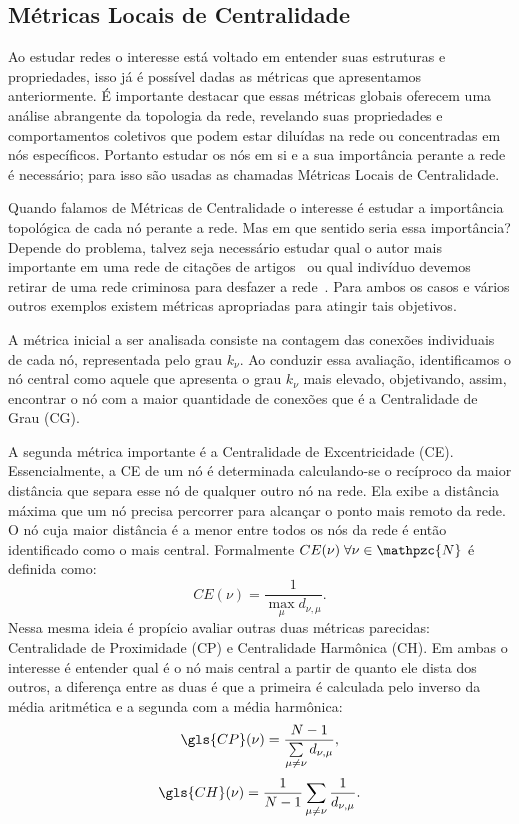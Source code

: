 \subsection{Métricas Locais de Centralidade}


Ao estudar redes o interesse está voltado em entender suas estruturas e propriedades, isso já é possível dadas as métricas que apresentamos anteriormente. É importante destacar que essas métricas globais oferecem uma análise abrangente da topologia da rede, revelando suas propriedades e comportamentos coletivos que podem estar diluídas na rede ou concentradas em nós específicos. Portanto estudar os nós em si e a sua importância perante a rede é necessário; para isso são usadas as chamadas Métricas Locais de Centralidade. 

Quando falamos de Métricas de Centralidade o interesse é estudar a importância topológica de cada nó perante a rede. 
Mas em que sentido seria essa importância? Depende do problema, talvez seja necessário estudar qual o autor mais importante em uma rede de citações de artigos~\cite{Leydesdorff2011} ou qual indivíduo devemos retirar de uma rede criminosa para desfazer a rede~\cite{deAndrade2021}. Para ambos os casos e vários outros exemplos existem métricas apropriadas para atingir tais objetivos.

A métrica inicial a ser analisada consiste na contagem das conexões individuais de cada nó, representada pelo grau $k_\nu$. Ao conduzir essa avaliação, identificamos o nó central como aquele que apresenta o grau $k_\nu$ mais elevado, objetivando, assim, encontrar o nó com a maior quantidade de conexões que é a Centralidade de Grau (\gls{CG}).

A segunda métrica importante é a Centralidade de Excentricidade (\gls{CE}). Essencialmente, a CE de um nó é determinada calculando-se o recíproco da maior distância que separa esse nó de qualquer outro nó na rede. Ela exibe a distância máxima que um nó precisa percorrer para alcançar o ponto mais remoto da rede. O nó cuja maior distância é a menor entre todos os nós da rede é então identificado como o mais central. Formalmente $CE(\nu)\; \forall \nu \in \mathpzc{N}$ é definida como:
\begin{equation}
  CE(\nu) = \frac{1}{\max\limits_{\mu} d_{\nu,\mu}}.
\end{equation}
Nessa mesma ideia é propício avaliar outras duas métricas parecidas: Centralidade de Proximidade (\gls{CP}) e Centralidade Harmônica (\gls{CH}). Em ambas o interesse é entender qual é o nó mais central a partir de quanto ele dista dos outros, a diferença entre as duas é que a primeira é calculada pelo inverso da média aritmética e a segunda com a média harmônica:
\begin{equation}
  \gls{CP}(\nu) = \frac{N - 1}{\sum\limits_{\mu \neq \nu} d_{\nu,\mu}},
\end{equation}
\begin{equation}
  \gls{CH}(\nu) = \frac{1}{N - 1}\sum_{\mu \neq \nu}\frac{1}{d_{\nu,\mu}}.
\end{equation}

